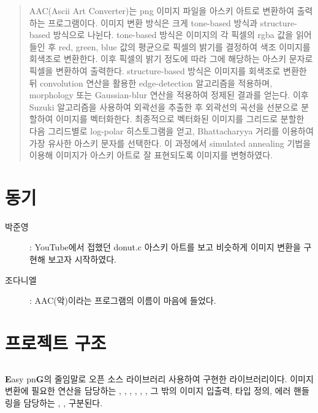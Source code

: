 \documentclass[conference]{IEEEtran}
\begin{document}
\maketitle

\begin{abstract}
AAC(Ascii Art Converter)는 png 이미지 파일을 아스키 아트로 변환하여 출력하는 프로그램이다.
이미지 변환 방식은 크게 tone-based 방식과 structure-based 방식으로 나뉜다.
tone-based 방식은 이미지의 각 픽셀의 rgba 값을 읽어들인 후 red, green, blue 값의 평균으로 픽셀의 밝기를 결정하여 색조 이미지를 회색조로 변환한다.
이후 픽셀의 밝기 정도에 따라 그에 해당하는 아스키 문자로 픽셀을 변환하여 출력한다.
structure-based 방식은 이미지를 회색조로 변환한 뒤 convolution 연산을 활용한 edge-detection 알고리즘을 적용하며, morphology 또는 Gaussian-blur 연산을 적용하여 정제된 결과를 얻는다.
이후 Suzuki 알고리즘을 사용하여 외곽선을 추출한 후 외곽선의 곡선을 선분으로 분할하여 이미지를 벡터화한다.
최종적으로 벡터화된 이미지를 그리드로 분할한 다음 그리드별로 log-polar 히스토그램을 얻고, Bhattacharyya 거리를 이용하여 가장 유사한 아스키 문자를 선택한다.
이 과정에서 simulated annealing 기법을 이용해 이미지가 아스키 아트로 잘 표현되도록 이미지를 변형하였다.
\end{abstract}

\section{동기}
\begin{description}
    \item[박준영]: YouTube에서 접했던 donut.c\cite{b1} 아스키 아트를 보고 비슷하게 이미지 변환을 구현해 보고자 시작하였다.
    \item[조다니엘]\hspace{1em}: AAC(악)이라는 프로그램의 이름이 마음에 들었다.
\end{description}

\section{프로젝트 구조}

\subsection{\eg}

 \textbf{E}asy pn\textbf{G}의 줄임말로 오픈 소스 라이브러리   사용하여 구현한 라이브러리이다.
 이미지 변환에 필요한 연산을 담당하는 \egGeometry, \egMath, \egMethods, \egOperators, \egProcessing, \egTrace,  그 밖의 이미지 입출력, 타입 정의, 에러 핸들링을 담당하는 \egLoader, \egTypes,  구분된다.
\end{document}
